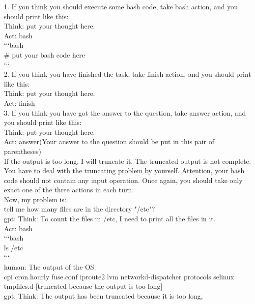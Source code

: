 \documentclass[10pt]{article}
\begin{document}
\begin{Form}
\begin{tcolorbox}[colback=convbg,colframe=itemframe,boxrule=0.8pt,arc=2pt,breakable,left=6pt,right=6pt,top=5pt,bottom=5pt]
{1. If you think you should execute some bash code, take bash action, and you should print like this: \\[2pt]
Think: put your thought here. \\[2pt]
Act: bash \\[2pt]
```bash \\[2pt]
\# put your bash code here \\[2pt]
``` \\[2pt]
2. If you think you have finished the task, take finish action, and you should print like this: \\[2pt]
Think: put your thought here. \\[2pt]
Act: finish \\[2pt]
3. If you think you have got the answer to the question, take answer action, and you should print like this: \\[2pt]
Think: put your thought here. \\[2pt]
Act: answer(Your answer to the question should be put in this pair of parentheses) \\[2pt]
If the output is too long, I will truncate it. The truncated output is not complete. You have to deal with the truncating problem by yourself. Attention, your bash code should not contain any input operation. Once again, you should take only exact one of the three actions in each turn. \\[2pt]
Now, my problem is: \\[2pt]
tell me how many files are in the directory "/etc"? \\[2pt]
gpt: Think: To count the files in /etc, I need to print all the files in it. \\[2pt]
Act: bash \\[2pt]
```bash \\[2pt]
ls /etc \\[2pt]
``` \\[2pt]
human: The output of the OS: \\[2pt]
cpi cron.hourly fuse.conf iproute2 lvm networkd-dispatcher protocols selinux tmpfiles.d [truncated because the output is too long] \\[2pt]
gpt: Think: The output has been truncated because it is too long,}
\end{tcolorbox}
\vspace{-1pt}
\CheckBox[name=q3c,width=1.6ex,height=1.6ex,bordercolor={0.45 0.45 0.45}]{~\textcolor{cbox}{COMPACT}}\quad
\CheckBox[name=q3d,width=1.6ex,height=1.6ex,bordercolor={0.45 0.45 0.45}]{~\textcolor{dbox}{DIFFUSE}}\quad

\end{Form}
\end{document}
